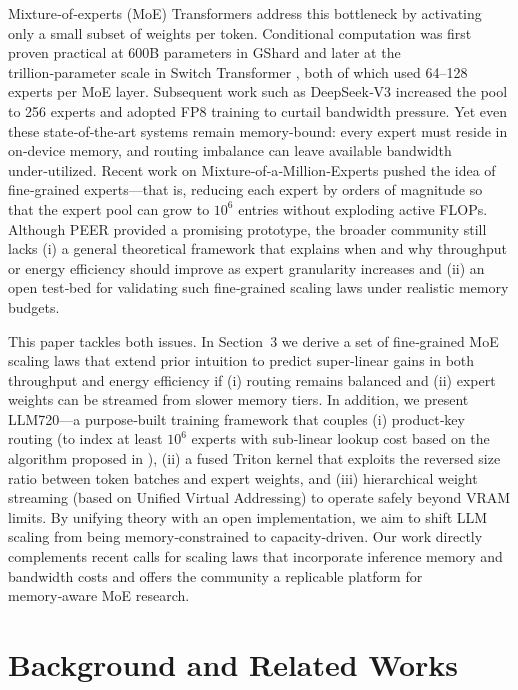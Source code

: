 \documentclass[12pt]{article}
\begin{document}
Mixture‑of‑experts (MoE) Transformers address this bottleneck by activating only a small subset of weights per token. Conditional computation was first proven practical at 600B parameters in GShard \cite{GShard2020} and later at the trillion‑parameter scale in Switch Transformer \cite{SwitchTransformer2021}, both of which used 64–128 experts per MoE layer. Subsequent work such as DeepSeek‑V3 \cite{DSv32024} increased the pool to 256 experts and adopted FP8 training to curtail bandwidth pressure. Yet even these state‑of‑the‑art systems remain memory‑bound: every expert must reside in on‑device memory, and routing imbalance can leave available bandwidth under‑utilized. Recent work on Mixture‑of‑a‑Million‑Experts \cite{MillionExperts2024} pushed the idea of fine‑grained experts---that is, reducing each expert by orders of magnitude so that the expert pool can grow to $10^6$ entries without exploding active FLOPs. Although PEER provided a promising prototype, the broader community still lacks (i) a general theoretical framework that explains when and why throughput or energy efficiency should improve as expert granularity increases and (ii) an open test‑bed for validating such fine‑grained scaling laws under realistic memory budgets.

This paper tackles both issues. In Section~3 we derive a set of fine‑grained MoE scaling laws that extend prior intuition to predict super‑linear gains in both throughput and energy efficiency if (i) routing remains balanced and (ii) expert weights can be streamed from slower memory tiers. In addition, we present LLM720—a purpose‑built training framework that couples (i) product‑key routing (to index at least $10^6$ experts with sub‑linear lookup cost based on the algorithm proposed in \cite{MillionExperts2024}), (ii) a fused Triton kernel that exploits the reversed size ratio between token batches and expert weights, and (iii) hierarchical weight streaming (based on Unified Virtual Addressing) to operate safely beyond VRAM limits. By unifying theory with an open implementation, we aim to shift LLM scaling from being memory‑constrained to capacity‑driven. Our work directly complements recent calls for scaling laws that incorporate inference memory and bandwidth costs \cite{BeyondChinchilla2024} and offers the community a replicable platform for memory‑aware MoE research.

\section{Background and Related Works}
\end{document}
